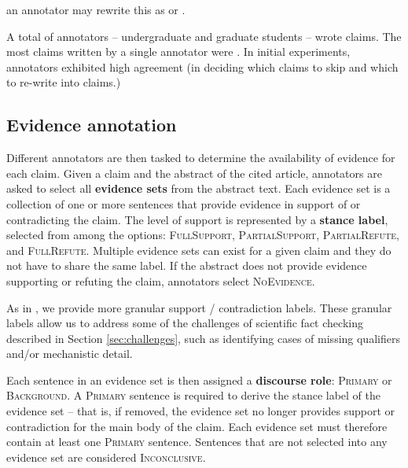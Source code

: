 
\noindent an annotator may rewrite this as \todo or \todo.

A total of \todo annotators -- \todo undergraduate and \todo graduate students -- wrote claims. The most claims written by a single annotator were \todo. In initial experiments, annotators exhibited high agreement (\todo in deciding which claims to skip and which to re-write into claims.)

\subsection{Evidence annotation}


Different annotators are then tasked to determine the availability of evidence for each claim. Given a claim and the abstract of the cited article, annotators are asked to select all \textbf{evidence sets} from the abstract text. Each evidence set is a collection of one or more sentences that provide evidence in support of or contradicting the claim. The level of support is represented by a \textbf{stance label}, selected from among the options: \textsc{FullSupport}, \textsc{PartialSupport}, \textsc{PartialRefute}, and \textsc{FullRefute}. Multiple evidence sets can exist for a given claim and they do not have to share the same label. If the abstract does not provide evidence supporting or refuting the claim, annotators select \textsc{NoEvidence}.

As in \citet{Hanselowski2019ARA}, we provide more granular support / contradiction labels. These granular labels allow us to address some of the challenges of scientific fact checking described in Section \ref{sec:challenges}, such as identifying cases of missing qualifiers and/or mechanistic detail.


Each sentence in an evidence set is then assigned a \textbf{discourse role}: \textsc{Primary} or \textsc{Background}.  A \textsc{Primary} sentence is required to derive the stance label of the evidence set -- that is, if removed, the evidence set no longer provides support or contradiction for the main body of the claim. Each evidence set must therefore contain at least one \textsc{Primary} sentence. Sentences that are not selected into any evidence set are considered \textsc{Inconclusive}.

